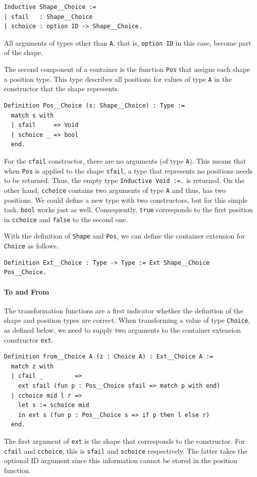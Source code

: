 \documentclass[a4paper, 11pt, fleqn, twoside, abstract=on]{scrreprt}
\newcommand{\hinl}[1]{\texttt{#1}}
\newcommand{\cinl}[1]{\texttt{#1}}
\begin{document}
\begin{verbatim}
Inductive Shape__Choice :=
| sfail   : Shape__Choice
| schoice : option ID -> Shape__Choice.
\end{verbatim}
\noindent
All arguments of types other than \cinl{A}, that is, \cinl{option ID} in this case, become part of the shape.

The second component of a container is the function \cinl{Pos} that assigns each shape a position type.
This type describes all positions for values of type \cinl{A} in the constructor that the shape represents.

\begin{verbatim}
Definition Pos__Choice (s: Shape__Choice) : Type :=
  match s with
  | sfail     => Void
  | schoice _ => bool
  end.
\end{verbatim}

For the \cinl{cfail} constructor, there are no arguments (of type \cinl{A}).
This means that when \cinl{Pos} is applied to the shape \cinl{sfail}, a type that represents no positions needs to be returned.
Thus, the empty type \cinl{Inductive Void :=.} is returned.
On the other hand, \hinl{cchoice} contains two arguments of type \cinl{A} and thus, has two positions.
We could define a new type with two constructors, but for this simple task, \cinl{bool} works just as well.
Consequently, \cinl{true} corresponds to the first position in \cinl{cchoice} and \cinl{false} to the second one.

With the definition of \cinl{Shape} and \cinl{Pos}, we can define the container extension for \cinl{Choice} as follows.

\begin{verbatim}
Definition Ext__Choice : Type -> Type := Ext Shape__Choice Pos__Choice.
\end{verbatim}

\paragraph{To and From}
The transformation functions are a first indicator whether the definition of the shape and position types are correct.
When transforming a value of type \cinl{Choice}, as defined below, we need to supply two arguments to the container extension constructor \cinl{ext}.

\begin{verbatim}
Definition from__Choice A (z : Choice A) : Ext__Choice A :=
  match z with
  | cfail _         =>
    ext sfail (fun p : Pos__Choice sfail => match p with end)
  | cchoice mid l r =>
    let s := schoice mid
    in ext s (fun p : Pos__Choice s => if p then l else r)
  end.
\end{verbatim}
\noindent
The first argument of \cinl{ext} is the shape that corresponds to the constructor.
For \cinl{cfail} and \cinl{cchoice}, this is \cinl{sfail} and \cinl{schoice} respectively.
The latter takes the optional ID argument since this information cannot be stored in the position function.
\end{document}

